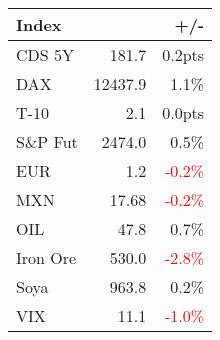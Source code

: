 \documentclass[article,crop=false]{standalone}%
\begin{document}
%
\scriptsize%
\renewcommand{\arraystretch}{1.2}%
\setlength{\tabcolsep}{0.15cm}%
\begin{tabular}{l  r  r  }%
\hline%
\textbf{Index}&\textbf{}&\textbf{+/{-}}\\%
\hline%
CDS 5Y&181.7&0.2pts\\%
DAX&12437.9&1.1\%\\%
T{-}10&2.1&0.0pts\\%
S\&P Fut&2474.0&0.5\%\\%
EUR&1.2&\textcolor{red}{ 
{-}0.2\%
}\\%
MXN&17.68&\textcolor{red}{ 
{-}0.2\%
}\\%
OIL&47.8&0.7\%\\%
Iron Ore&530.0&\textcolor{red}{ 
{-}2.8\%
}\\%
Soya&963.8&0.2\%\\%
VIX&11.1&\textcolor{red}{ 
{-}1.0\%
}\\%
\hline%
\end{tabular}%
\end{document}
